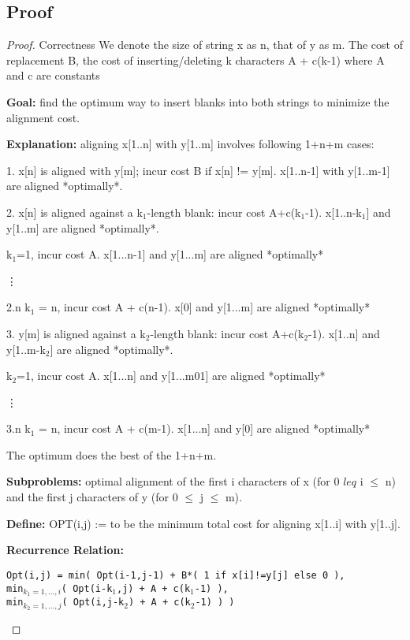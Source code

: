 \documentclass[openany]{article}
\begin{document}
\subsection*{Proof}
\begin{proof}{Correctness}
    We denote the size of string x as n, that of y as m. The cost of replacement B, the cost of inserting/deleting k characters A + c(k-1) where A and c are constants

    \textbf{Goal:} find the optimum way to insert blanks into both strings to minimize the alignment cost.
    
    \textbf{Explanation:} aligning x[1..n] with y[1..m] involves following 1+n+m cases:
    
    1. x[n] is aligned with y[m]; incur cost B if x[n] != y[m]. x[1..n-1] with y[1..m-1] are aligned *optimally*.
    
    2. x[n] is aligned against a k$_1$-length blank: incur cost A+c(k$_1$-1). x[1..n-k$_1$] and y[1..m] are aligned *optimally*.
    
         k$_1$=1, incur cost A. x[1...n-1] and y[1...m] are aligned *optimally*
        
        \qquad \vdots
        
        \qquad 2.n k$_1$ = n, incur cost A + c(n-1). x[0] and y[1...m] are aligned *optimally*
    
3. y[m] is aligned against a k$_2$-length blank: incur cost A+c(k$_2$-1). x[1..n] and y[1..m-k$_2$] are aligned *optimally*.

         k$_2$=1, incur cost A. x[1...n] and y[1...m01] are aligned *optimally*
        
        \qquad \vdots
        
        \qquad 3.n k$_1$ = n, incur cost A + c(m-1). x[1...n] and y[0] are aligned *optimally*

The optimum does the best of the 1+n+m.

    \textbf{Subproblems:} optimal alignment of the first i characters of x (for 0 $leq$ i $\leq$ n) and the first j characters of y (for 0 $\leq$ j $\leq$ m).
    
    \textbf{Define:} OPT(i,j) := to be the minimum total cost for aligning x[1..i] with y[1..j].
    
    \textbf{Recurrence Relation:} 
    \begin{center}
        \texttt{Opt(i,j) = min(  Opt(i-1,j-1) + B*( 1 if x[i]!=y[j] else 0 ),\\
        min$_{k_1=1,...,i}$( Opt(i-k$_1$,j) + A + c(k$_1$-1) ),\\
        min$_{k_2=1,...,j}$( Opt(i,j-k$_2$) + A + c(k$_2$-1) )  )}
    \end{center}
    

\end{proof}
\end{document}
